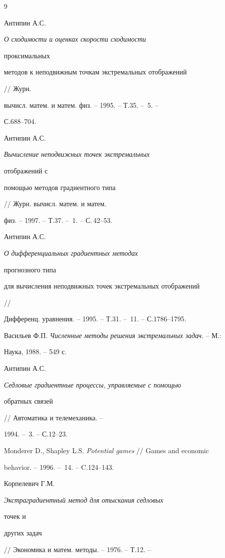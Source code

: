 \begin{thebibliography}{9}







Антипин А.С. {\em О сходимости и оценках скорости сходимости


проксимальных


методов к неподвижным точкам экстремальных отображений} // Журн.


вычисл. матем. и матем. физ. -- 1995. -- Т.35. -- \No\,5. --


С.688--704.




Антипин А.С. {\em Вычисление неподвижных точек экстремальных


отображений с


помощью методов градиентного типа} // Журн. вычисл. матем. и матем.


физ. -- 1997. -- Т.37. -- \No\,1. -- С.\,42--53.




Антипин А.С. {\em О дифференциальных градиентных методах


прогнозного типа


для вычисления неподвижных точек экстремальных отображений} //


Дифференц. уравнения. -- 1995. -- Т.31. -- \No\,11. -- С.1786--1795.




Васильев Ф.П. {\em Численные методы решения экстремальных задач}. -- М.:


Наука, 1988. -- 549 с.




Антипин А.С. {\em Седловые градиентные процессы, управляемые с помощью


обратных связей} // Автоматика и телемеханика. --


1994. -- \No\,3. -- С.12--23.




Monderer D., Shapley L.S. {\em Potential games} // Games and economic


behavior. -- 1996. -- \No\,14. -- C.124--143.




Корпелевич Г.М. {\em Экстраградиентный метод для отыскания седловых


точек и


других задач} // Экономика и матем. методы. -- 1976. -- Т.12. --



\end{thebibliography}
